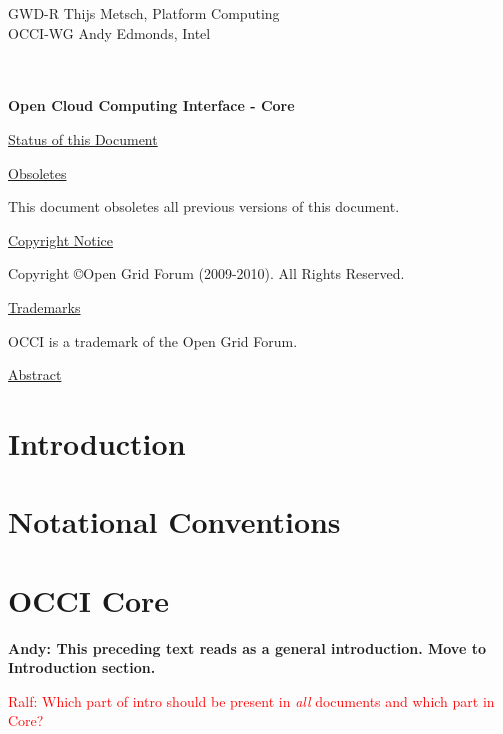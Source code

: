 \documentclass[10pt,a4paper]{article}
\newcommand{\ralf}[1]{\textcolor{red}{Ralf: #1}}
\begin{document}
\thispagestyle{empty}

GWD-R \hfill  Thijs Metsch, Platform Computing\\
OCCI-WG \hfill  Andy Edmonds, Intel\\
\\
\\

\vspace*{0.5in}

\begin{Large}
\textbf{Open Cloud Computing Interface - Core}
\end{Large}

\vspace*{0.5in}

\underline{Status of this Document}



\underline{Obsoletes}

This document obsoletes all previous versions of this document.

\underline{Copyright Notice}

Copyright \copyright Open Grid Forum (2009-2010). All Rights Reserved.

\underline{Trademarks}

OCCI is a trademark of the Open Grid Forum.

\underline{Abstract}



\newpage
\tableofcontents
\newpage

\section{Introduction}


\section{Notational Conventions}


\section{OCCI Core}
\textbf{Andy: This preceding text reads as a general introduction. Move to Introduction section.}

\ralf{Which part of intro should be present in {\em all} documents and which part in Core?}
\end{document}
